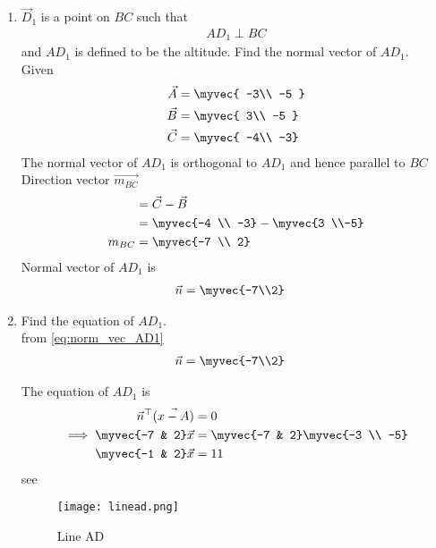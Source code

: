 \documentclass[11pt]{book}
\begin{document}
\begin{enumerate}[label=\thesection.\arabic*.,ref=\thesection.\theenumi]

\item $\vec{D}_1$ is a point on $BC$ such that
\begin{align}
AD_1 \perp BC
\end{align}
and $AD_1$ is defined to be the altitude. Find the normal vector of $AD_1$.
  \\   \solution Given  \\
  \begin{align} 
 \vec{A} &= \myvec{ -3\\ -5 } \\ \vec{B} &= \myvec{ 3\\ -5 }
  \\\vec{C} &= \myvec{ -4\\ -3}
 \end{align}
The normal vector of $AD_{1}$ is orthogonal to $AD_1$ and hence parallel to $BC$ \\ Direction vector $\vec{m_{BC}}$ 
\begin{align}
    &=\vec{C}-\vec{B}\\
    &=\myvec{-4 \\ -3} -\myvec{3 \\-5} \\
    m_{BC} &= \myvec{-7 \\ 2}
\end{align}
Normal vector of $AD_1$ is
\begin{align}
\label{eq:norm_vec_AD1}
	\vec{n} &= 
\myvec{-7\\2}
\end{align}

\item Find the equation of $AD_1$.
 \\    \solution from \eqref{eq:norm_vec_AD1} 
 \begin{align}
	\vec{n} &= 
\myvec{-7\\2}
\end{align}

The equation of $AD_1$ is
\begin{align}
 \vec{n}^{\top}(\vec{x-A}) &= 0 \\
\implies \myvec{-7 & 2}\vec{x} &= \myvec{-7 & 2}\myvec{-3 \\ -5}\\
\myvec{-1 & 2}\vec{x} &= 11
\end{align}
see 
\begin{figure}[H]
    \centering
    \texttt{[image: linead.png]}
    \caption{Line AD}
    \label{fig:line_ad}
\end{figure}
 

\end{enumerate}
\end{document}
